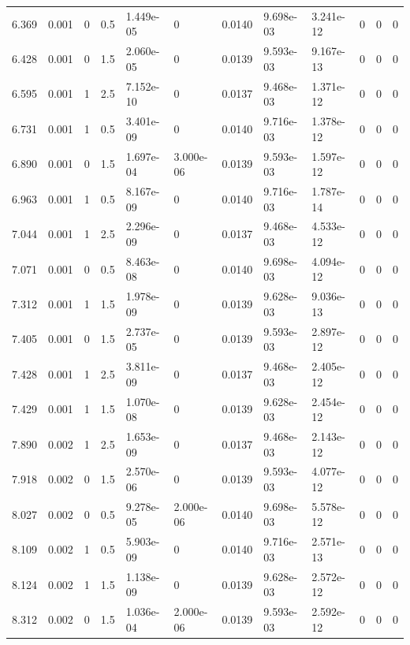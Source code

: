 \documentclass[preview]{standalone}
\begin{document}
{{{\begin{tabular}{L{1.2cm}C{1.2cm} C{0.3cm}C{0.5cm} C{1.4cm}C{1.4cm} C{1.4cm}C{1.4cm} C{1.6cm}C{1.6cm} C{1.6cm}C{1.6cm}}
  6.369  &  0.001  & 0     & 0.5 &  1.449e-05  & 0  &  0.0140&   9.698e-03& 3.241e-12 & 0   &  0 & 0  \\ 
  6.428  &  0.001  & 0     & 1.5 &  2.060e-05  & 0  &  0.0139&   9.593e-03& 9.167e-13 & 0   &  0 & 0  \\ 
  6.595  &  0.001  & 1     & 2.5 &  7.152e-10  & 0  &  0.0137&   9.468e-03& 1.371e-12 & 0   &  0 & 0  \\ 
  6.731  &  0.001  & 1     & 0.5 &  3.401e-09  & 0  &  0.0140&   9.716e-03& 1.378e-12 & 0   &  0 & 0  \\ 
  6.890  &  0.001  & 0     & 1.5 &  1.697e-04  & 3.000e-06  &  0.0139&   9.593e-03& 1.597e-12 & 0   &  0 & 0  \\ 
  6.963  &  0.001  & 1     & 0.5 &  8.167e-09  & 0  &  0.0140&   9.716e-03& 1.787e-14 & 0   &  0 & 0  \\ 
  7.044  &  0.001  & 1     & 2.5 &  2.296e-09  & 0  &  0.0137&   9.468e-03& 4.533e-12 & 0   &  0 & 0  \\ 
  7.071  &  0.001  & 0     & 0.5 &  8.463e-08  & 0  &  0.0140&   9.698e-03& 4.094e-12 & 0   &  0 & 0  \\ 
  7.312  &  0.001  & 1     & 1.5 &  1.978e-09  & 0  &  0.0139&   9.628e-03& 9.036e-13 & 0   &  0 & 0  \\ 
  7.405  &  0.001  & 0     & 1.5 &  2.737e-05  & 0  &  0.0139&   9.593e-03& 2.897e-12 & 0   &  0 & 0  \\ 
  7.428  &  0.001  & 1     & 2.5 &  3.811e-09  & 0  &  0.0137&   9.468e-03& 2.405e-12 & 0   &  0 & 0  \\ 
  7.429  &  0.001  & 1     & 1.5 &  1.070e-08  & 0  &  0.0139&   9.628e-03& 2.454e-12 & 0   &  0 & 0  \\ 
  7.890  &  0.002  & 1     & 2.5 &  1.653e-09  & 0  &  0.0137&   9.468e-03& 2.143e-12 & 0   &  0 & 0  \\ 
  7.918  &  0.002  & 0     & 1.5 &  2.570e-06  & 0  &  0.0139&   9.593e-03& 4.077e-12 & 0   &  0 & 0  \\ 
  8.027  &  0.002  & 0     & 0.5 &  9.278e-05  & 2.000e-06  &  0.0140&   9.698e-03& 5.578e-12 & 0   &  0 & 0  \\ 
  8.109  &  0.002  & 1     & 0.5 &  5.903e-09  & 0  &  0.0140&   9.716e-03& 2.571e-13 & 0   &  0 & 0  \\ 
  8.124  &  0.002  & 1     & 1.5 &  1.138e-09  & 0  &  0.0139&   9.628e-03& 2.572e-12 & 0   &  0 & 0  \\ 
  8.312  &  0.002  & 0     & 1.5 &  1.036e-04  & 2.000e-06  &  0.0139&   9.593e-03& 2.592e-12 & 0   &  0 & 0  \\ 

\end{tabular}}}}
\end{document}
